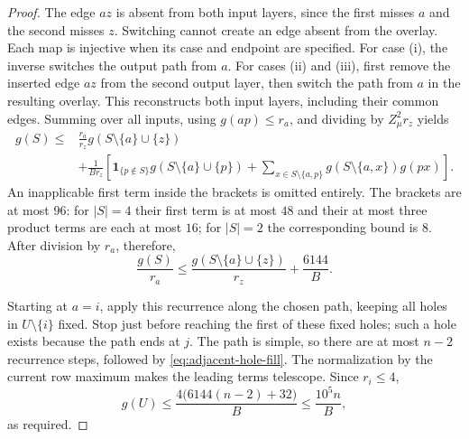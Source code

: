 \documentclass[11pt]{article}
\theoremstyle{definition}
\theoremstyle{remark}
\numberwithin{equation}{section}
\begin{document}
\begin{proof}
The edge $az$ is absent from both input layers, since the first misses
$a$ and the second misses $z$. Switching cannot create an edge absent
from the overlay. Each map is injective when its case and endpoint are specified.
For case (i), the inverse switches the output path from $a$.
For cases (ii) and (iii), first remove the inserted edge $az$ from the
second output layer, then switch the path from $a$ in the resulting
overlay.  This reconstructs both input layers, including their common
edges.  Summing over all inputs, using $g(ap)\le r_a$, and dividing by
$Z_\mu^2r_z$ yields
\begin{equation}
\label{eq:relocation-step}
\begin{split}
 g(S)\le{}&\frac{r_a}{r_z}
                g(S\setminus\{a\}\cup\{z\})\\
 &+\frac{1}{B r_z}\left[
   \mathbf 1_{\{p\notin S\}}g(S\setminus\{a\}\cup\{p\})
   +\sum_{x\in S\setminus\{a,p\}}
        g(S\setminus\{a,x\})g(px)\right].
\end{split}
\end{equation}
An inapplicable first term inside the brackets is omitted entirely.
The brackets are at most $96$: for $|S|=4$ their first term is at most
$48$ and their at most three product terms are each at most $16$;
for $|S|=2$ the corresponding bound is $8$.
After division by $r_a$, therefore,
\begin{equation}
\label{eq:normalized-relocation}
 \frac{g(S)}{r_a}\le
 \frac{g(S\setminus\{a\}\cup\{z\})}{r_z}
       +\frac{6144}{B}.
\end{equation}

Starting at $a=i$, apply this recurrence along the chosen path, keeping
all holes in $U\setminus\{i\}$ fixed.  Stop just before reaching the
first of these fixed holes; such a hole exists because the path ends
at $j$.  The path is simple, so there are at most $n-2$ recurrence
steps, followed by \eqref{eq:adjacent-hole-fill}.  The normalization by
the current row maximum makes the leading terms telescope.  Since
$r_i\le4$,
\[
 g(U)\le\frac{4\bigl(6144(n-2)+32\bigr)}{B}
       \le\frac{10^5n}{B},
\]
as required.
\end{proof}
\end{document}
